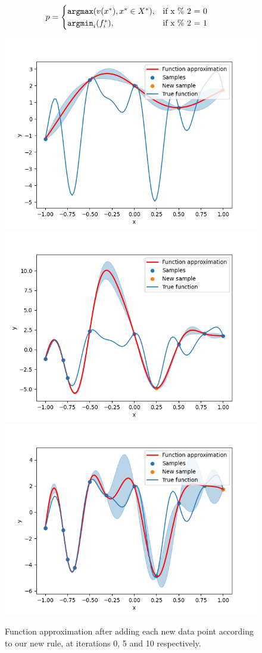 \begin{align}
  p &=
  \begin{cases}
    \texttt{argmax} ( v(x^*), x^* \in X^*), & \text{if } $x \% 2 = 0$\\
    \texttt{argmin}_i (f_i^*), & \text{if } $x \% 2 = 1$
  \end{cases}
\end{align}


\begin{figure}[h]
\centering
\includegraphics[width=0.3\linewidth]{images/iter_0.png}
\includegraphics[width=0.3\linewidth]{images/iter_5.png}
\includegraphics[width=0.3\linewidth]{images/iter_9.png}
\setlength{\belowcaptionskip}{-10pt}
\caption{Function approximation after adding each new data point according to our new rule, at iterations 0, 5 and 10 respectively.}
\label{fig:iter_new}
\end{figure}


